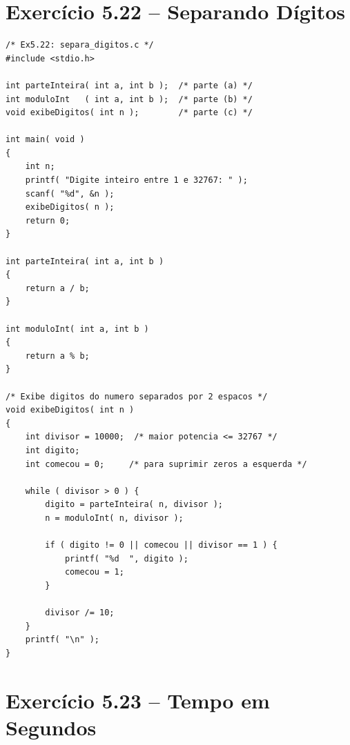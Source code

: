 \documentclass[12pt,a4paper]{article}
\begin{document}
\section{Exercício 5.22 -- Separando Dígitos}

\begin{respostabox}
\begin{lstlisting}
/* Ex5.22: separa_digitos.c */
#include <stdio.h>

int parteInteira( int a, int b );  /* parte (a) */
int moduloInt   ( int a, int b );  /* parte (b) */
void exibeDigitos( int n );        /* parte (c) */

int main( void )
{
    int n;
    printf( "Digite inteiro entre 1 e 32767: " );
    scanf( "%d", &n );
    exibeDigitos( n );
    return 0;
}

int parteInteira( int a, int b )
{
    return a / b;
}

int moduloInt( int a, int b )
{
    return a % b;
}

/* Exibe digitos do numero separados por 2 espacos */
void exibeDigitos( int n )
{
    int divisor = 10000;  /* maior potencia <= 32767 */
    int digito;
    int comecou = 0;     /* para suprimir zeros a esquerda */

    while ( divisor > 0 ) {
        digito = parteInteira( n, divisor );
        n = moduloInt( n, divisor );

        if ( digito != 0 || comecou || divisor == 1 ) {
            printf( "%d  ", digito );
            comecou = 1;
        }

        divisor /= 10;
    }
    printf( "\n" );
}
\end{lstlisting}
\end{respostabox}

\newpage

\section{Exercício 5.23 -- Tempo em Segundos}
\end{document}
